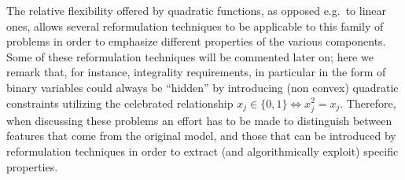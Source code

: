 The relative flexibility offered by quadratic functions, as opposed e.g.~to linear ones, allows several reformulation techniques to be applicable to this family of problems in order to emphasize different properties of the various components. Some of these reformulation techniques will be commented later on; here we remark that, for instance, integrality requirements, 
in particular in the form of binary variables could always be ``hidden'' 
by introducing (non convex) quadratic constraints utilizing the celebrated relationship
$x_j \in \{0, 1\} \iff x_j^2 = x_j$. Therefore, when discussing these problems an effort has to be made to distinguish between features that come from the original model, and those that can be introduced by reformulation techniques in order to extract (and algorithmically exploit) specific properties.


